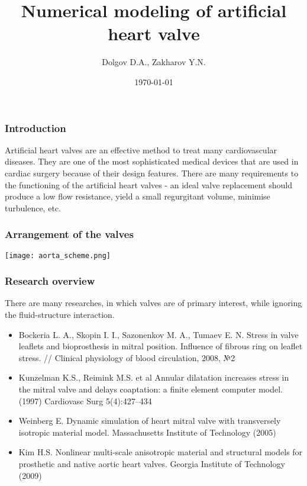 \documentclass[14pt]{beamer}
\title[Numerical modeling of artificial heart valve]{Numerical modeling of artificial heart valve}
\date{\today}
\author[Dolgov D.A.]{Dolgov D.A., Zakharov Y.N.}
\institute{Kemerovo State University \\
    \vspace{0.7cm}
    \vspace{0.7cm}
}
\begin{document}
\maketitle

\begin{frame}
\frametitle{Introduction}
Artificial heart valves are an effective method to treat many cardiovascular diseases. They are one of the most sophisticated medical devices that are used in cardiac surgery because of their design features. There are many requirements to the functioning of the artificial heart valves - an ideal valve replacement should produce a low flow resistance, yield a small regurgitant volume, minimise turbulence, etc.
\end{frame}

\begin{frame}
\frametitle{Arrangement of the valves}
    \begin{center}
        \texttt{[image: aorta\_scheme.png]}
    \end{center}
\end{frame}

\begin{frame}
\frametitle{Research overview}
    There are many researches, in which valves are of primary interest, while ignoring the fluid-structure interaction.
    \par
    {\tiny
        \begin{itemize}
            \item[\MVRightarrow] Bockeria L. A., Skopin I. I., Sazonenkov M. A., Tumaev E. N. Stress in valve leaflets and bioprosthesis in mitral position. Influence of fibrous ring on leaflet stress. // Clinical physiology of blood circulation, 2008, №2
            \item[\MVRightarrow] Kunzelman K.S., Reimink M.S. et al  Annular dilatation increases stress in the mitral valve and delays coaptation: a finite element computer model. (1997) Cardiovasc Surg 5(4):427–434
            \item[\MVRightarrow] Weinberg E. Dynamic simulation of heart mitral valve with transversely isotropic material model. Massachusetts Institute of Technology (2005)
            \item[\MVRightarrow] Kim H.S. Nonlinear multi-scale anisotropic material and structural models for prosthetic and native aortic heart valves. Georgia Institute of Technology (2009)
        \end{itemize}
    }
\end{frame}
\end{document}
